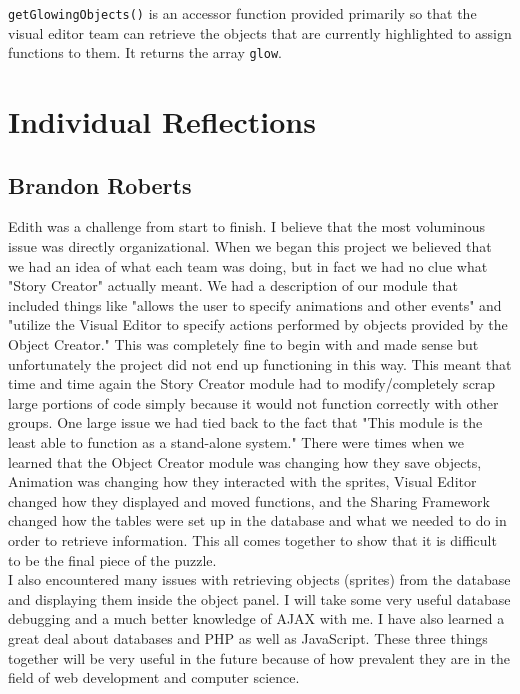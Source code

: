 \documentclass[12pt]{article}
\begin{document}
\texttt{getGlowingObjects()} is an accessor function provided primarily so that the visual editor team can retrieve the objects that are currently highlighted to assign functions to them. It returns the array \texttt{glow}. \\

\section{Individual Reflections}

\subsection{Brandon Roberts}
Edith was a challenge from start to finish. I believe that the most voluminous issue was directly organizational. When we began this project we believed that we had an idea of what each team was doing, but in fact we had no clue what "Story Creator" actually meant. We had a description of our module that included things like "allows the user to specify animations and other events" and "utilize the Visual Editor to specify actions performed by objects provided by the Object Creator." This was completely fine to begin with and made sense but unfortunately the project did not end up functioning in this way.  This meant that time and time again the Story Creator module had to modify/completely scrap large portions of code simply because it would not function correctly with other groups. One large issue we had tied back to the fact that "This module is the least able to function as a stand-alone system." There were times when we learned that the Object Creator module was changing how they save objects, Animation was changing how they interacted with the sprites, Visual Editor changed how they displayed and moved functions, and the Sharing Framework changed how the tables were set up in the database and what we needed to do in order to retrieve information. This all comes together to show that it is difficult to be the final piece of the puzzle.  \\

I also encountered many issues with retrieving objects (sprites) from the database and displaying them inside the object panel. I will take some very useful database debugging and a much better knowledge of AJAX with me. I have also learned a great deal about databases and PHP as well as JavaScript. These three things together will be very useful in the future because of how prevalent they are in the field of web development and computer science. \\
\end{document}
